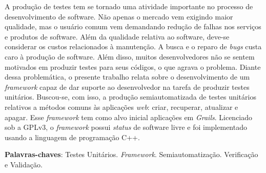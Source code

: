 \begin{resumo}
A produção de testes tem se tornado uma atividade importante no processo de
desenvolvimento de software. Não apenas o mercado vem exigindo maior qualidade,
mas o usuário comum vem demandando redução de falhas nos serviços e produtos
de software. Além da qualidade relativa ao software, deve-se considerar os
custos relacionados à manutenção. A busca e o reparo de \textit{bugs} custa
caro à produção de software. Além disso, muitos desenvolvedores não se sentem
motivados em produzir testes para seus códigos, o que agrava o problema. Diante
dessa problemática, o presente trabalho relata sobre o desenvolvimento de um
\textit{framework} capaz de dar suporte ao desenvolvedor na tarefa de produzir
testes unitários. Buscou-se, com isso, a produção semiautomatizada de testes
unitários relativos a métodos comuns às aplicações \textit{web}: criar,
recuperar, atualizar e apagar. Esse \textit{framework} tem como alvo inicial
aplicações em \textit{Grails}. Licenciado sob a GPLv3, o \textit{framework}
possui \textit{status} de software livre e foi implementado usando a linguagem
de programação C++.
\vspace{\onelineskip}

\noindent
\textbf{Palavras-chaves}: Testes Unitários. \textit{Framework}.
Semiautomatização. Verificação e Validação.
\end{resumo}
